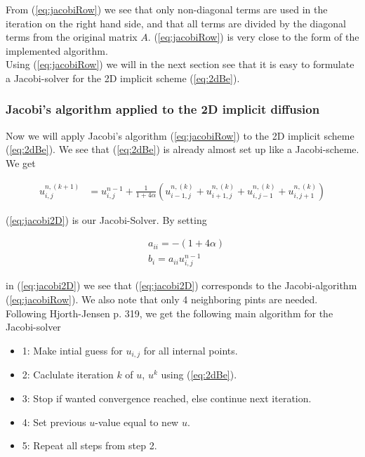 \documentclass{article}
\begin{document}
From (\ref{eq:jacobiRow}) we see that only non-diagonal terms are used in the iteration on the right hand side, and that all terms are divided by the diagonal terms from the original matrix $A$. (\ref{eq:jacobiRow}) is very close to the form of the implemented algorithm.\\

Using (\ref{eq:jacobiRow}) we will in the next section see that it is easy to formulate a Jacobi-solver for the 2D implicit scheme (\ref{eq:2dBe}).

\subsubsection{Jacobi's algorithm applied to the 2D implicit diffusion}
Now we will apply Jacobi's algorithm (\ref{eq:jacobiRow}) to the 2D implicit scheme (\ref{eq:2dBe}). We see that (\ref{eq:2dBe}) is already almost set up like a Jacobi-scheme. We get

\begin{subequations}\label{eq:jacobi2D}
	\begin{align}
				u_{i,j}^{n,(k+1)} &= u_{i,j}^{n-1}  + \frac{1}{1+4\alpha}(u_{i-1,j}^{n, (k)} 
		+ u_{i+1,j}^{n,(k)} + u_{i,j-1}^{n,(k)} + u_{i,j+1}^{n,(k)})
	\end{align}
\end{subequations}

(\ref{eq:jacobi2D}) is our Jacobi-Solver. By setting

\begin{subequations}
	\begin{align}
		&a_{ii} = -(1 + 4\alpha)\\
		&b_i = a_{ii} u_{i,j}^{n-1}
	\end{align}
\end{subequations}

in (\ref{eq:jacobi2D}) we see that (\ref{eq:jacobi2D}) corresponds to the Jacobi-algorithm (\ref{eq:jacobiRow}). We also note that only 4 neighboring pints are needed.\\

Following Hjorth-Jensen \cite{MHJ} p. 319, we get the following main algorithm for the Jacobi-solver

\begin{itemize}
	\item{1: Make intial guess for $u_{i,j}$ for all internal points.}
	\item{2: Caclulate iteration $k$ of $u$, $u^k$ using (\ref{eq:2dBe})}.
	\item{3: Stop if wanted convergence reached, else continue next iteration.}
	\item{4: Set previous $u$-value equal to new $u$.}
	\item{5: Repeat all steps from step 2.}
\end{itemize}
\end{document}
